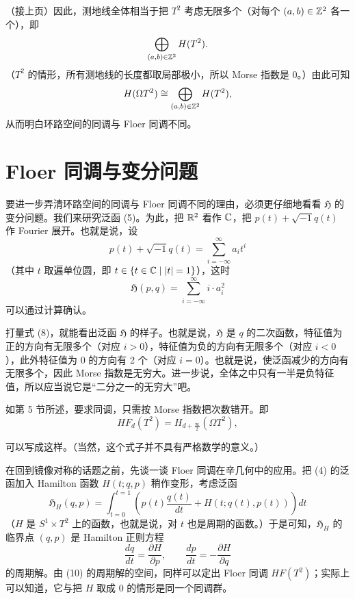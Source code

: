 （接上页）因此，测地线全体相当于把 $T^{2}$ 考虑无限多个（对每个 $(a,b)\in\mathbb{Z}^{2}$ 各一个），即
\[ \bigoplus_{(a,b)\in\mathbb{Z}^{2}}H(T^{2}) . \]
（$T^{2}$ 的情形，所有测地线的长度都取局部极小，所以 Morse 指数是 0。）由此可知
\[ H(\Omega T^{2})\cong\bigoplus_{(a,b)\in\mathbb{Z}^{2}}H(T^{2}), \]
从而明白环路空间的同调与 Floer 同调不同。

\section{Floer 同调与变分问题}

要进一步弄清环路空间的同调与 Floer 同调不同的理由，必须更仔细地看看 $\mathfrak{H}$ 的变分问题。我们来研究泛函 (5)。为此，把 $\mathbb{R}^{2}$ 看作 $\mathbb{C}$，把 $p(t)+\sqrt{-1}q(t)$ 作 Fourier 展开。也就是说，设
\[ p(t)+\sqrt{-1}q(t)=\sum_{i=-\infty}^{\infty}a_it^{i} \tag{7} \]
（其中 $t$ 取遍单位圆，即 $t\in\{t\in\mathbb{C}\mid |t|=1\}$），这时
\[ \mathfrak{H}(p,q)=\sum_{i=-\infty}^{\infty}i\cdot a_i^{2} \tag{8} \]
可以通过计算确认。

打量式 (8)，就能看出泛函 $\mathfrak{H}$ 的样子。也就是说，$\mathfrak{H}$ 是 $q$ 的二次函数，特征值为正的方向有无限多个（对应 $i>0$），特征值为负的方向有无限多个（对应 $i<0$），此外特征值为 0 的方向有 2 个（对应 $i=0$）。也就是说，使泛函减少的方向有无限多个，因此 Morse 指数是无穷大。进一步说，全体之中只有一半是负特征值，所以应当说它是“二分之一的无穷大”吧。

如第 5 节所述，要求同调，只需按 Morse 指数把次数错开。即
\[ HF_d(T^{2})=H_{d+\frac{\infty}{2}}(\Omega T^{2}), \]

可以写成这样。（当然，这个式子并不具有严格数学的意义。）

在回到镜像对称的话题之前，先谈一谈 Floer 同调在辛几何中的应用。把 (4) 的泛函加入 Hamilton 函数 $H(t;q,p)$ 稍作变形，考虑泛函
\[ \mathfrak{H}_H(q,p)=\int_{t=0}^{t=1}\left(p(t)\frac{q(t)}{dt}+H(t;q(t),p(t))\right)dt \tag{9} \]
（$H$ 是 $S^{1}\times T^{2}$ 上的函数，也就是说，对 $t$ 也是周期的函数。）于是可知，$\mathfrak{H}_H$ 的临界点 $(q,p)$ 是 Hamilton 正则方程
\[ \frac{dq}{dt}=\frac{\partial H}{\partial p},\qquad \frac{dp}{dt}=-\frac{\partial H}{\partial q} \tag{10} \]
的周期解。由 (10) 的周期解的空间，同样可以定出 Floer 同调 $HF(T^{2})$；实际上可以知道，它与把 $H$ 取成 0 的情形是同一个同调群。

